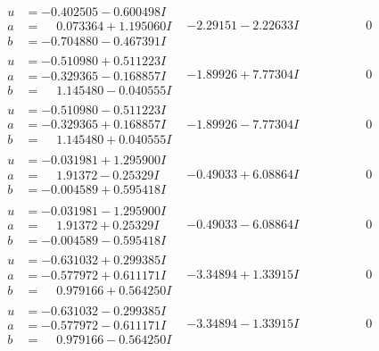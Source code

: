\documentclass[1p]{elsarticle_modified}
\theoremstyle{definition}
\begin{document}
$$\begin{array}{c|c|c}
\begin{aligned}
u &= -0.402505 - 0.600498 I \\
a &= \phantom{-}0.073364 + 1.195060 I \\
b &= -0.704880 - 0.467391 I\end{aligned}
 & -2.29151 - 2.22633 I & \phantom{-0.000000 } 0 \\ \hline\begin{aligned}
u &= -0.510980 + 0.511223 I \\
a &= -0.329365 - 0.168857 I \\
b &= \phantom{-}1.145480 - 0.040555 I\end{aligned}
 & -1.89926 + 7.77304 I & \phantom{-0.000000 } 0 \\ \hline\begin{aligned}
u &= -0.510980 - 0.511223 I \\
a &= -0.329365 + 0.168857 I \\
b &= \phantom{-}1.145480 + 0.040555 I\end{aligned}
 & -1.89926 - 7.77304 I & \phantom{-0.000000 } 0 \\ \hline\begin{aligned}
u &= -0.031981 + 1.295900 I \\
a &= \phantom{-}1.91372 - 0.25329 I \\
b &= -0.004589 + 0.595418 I\end{aligned}
 & -0.49033 + 6.08864 I & \phantom{-0.000000 } 0 \\ \hline\begin{aligned}
u &= -0.031981 - 1.295900 I \\
a &= \phantom{-}1.91372 + 0.25329 I \\
b &= -0.004589 - 0.595418 I\end{aligned}
 & -0.49033 - 6.08864 I & \phantom{-0.000000 } 0 \\ \hline\begin{aligned}
u &= -0.631032 + 0.299385 I \\
a &= -0.577972 + 0.611171 I \\
b &= \phantom{-}0.979166 + 0.564250 I\end{aligned}
 & -3.34894 + 1.33915 I & \phantom{-0.000000 } 0 \\ \hline\begin{aligned}
u &= -0.631032 - 0.299385 I \\
a &= -0.577972 - 0.611171 I \\
b &= \phantom{-}0.979166 - 0.564250 I\end{aligned}
 & -3.34894 - 1.33915 I & \phantom{-0.000000 } 0 \\ \hline\begin{aligned}

\end{aligned}
\end{array}$$
\end{document}
